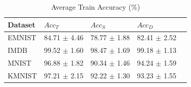 \begin{table}
\caption{Average Train Accuracy (\%)}
\label{tab:train-acc}
\begin{tabular}{lllll}
\toprule
Dataset & $Acc_T$ & $Acc_S$ & $Acc_D$ \\
\midrule
EMNIST & 84.71 $\pm$ 4.46 & 78.77 $\pm$ 1.88 & 82.41 $\pm$ 2.52 \\
IMDB & 99.52 $\pm$ 1.60 & 98.47 $\pm$ 1.69 & 99.18 $\pm$ 1.13 \\
MNIST & 96.88 $\pm$ 1.82 & 90.34 $\pm$ 1.46 & 94.24 $\pm$ 1.59 \\
KMNIST & 97.21 $\pm$ 2.15 & 92.22 $\pm$ 1.30 & 93.23 $\pm$ 1.55 \\
\bottomrule
\end{tabular}
\end{table}
